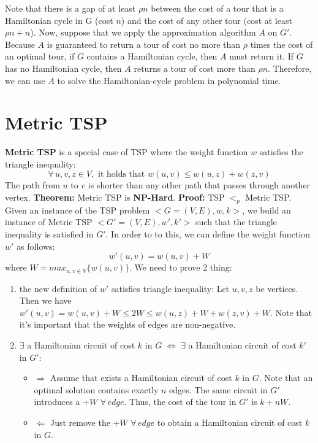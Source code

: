 Note that there is a gap of at least $\rho n$ between the cost
of a tour that is a Hamiltonian cycle in G (cost $n$) and the cost of any other tour (cost at least $\rho n + n$).\newline\newline
Now, suppose that we apply the approximation algorithm $A$ on $G'$. Because $A$ is guaranteed to return a tour of cost no more than $\rho$ times the cost of an optimal tour, if $G$ contains a Hamiltonian cycle, then $A$ must return it. If $G$ has no Hamiltonian cycle, then $A$ returns a tour of cost more than $\rho n$. Therefore, we can use $A$ to solve the Hamiltonian-cycle problem in polynomial time.


\section{Metric TSP}
\textbf{Metric TSP} is a special case of TSP where the weight function $w$ satisfies the triangle inequality:
\[\forall \, u, v, z \in V, \,\, \text{it holds that } w(u, v) \leq w(u, z) + w(z,v)\]
The path from $u$ to $v$ is shorter than any other path that passes through another vertex.\newline\newline
\textbf{Theorem:} Metric TSP is \textbf{NP-Hard}.\newline\newline
\textbf{Proof:} TSP $<_p$ Metric TSP.\newline
Given an instance of the TSP problem $<G=(V,E), w, k>$, we build an instance of Metric TSP $<G'=(V,E), w', k'>$ such that the triangle inequality is satisfied in $G'$. In order to to this, we can define the weight function $w'$ as follows:
\[w'(u, v) = w(u, v) + W\]
where $W = max_{u, v \in V}\{w(u, v)\}$.\newline\newline
We need to prove 2 thing:
\begin{enumerate}
    \item the new definition of $w'$ satisfies triangle inequality:\newline\newline
    Let $u, v, z$ be vertices. Then we have $w'(u, v) = w(u, v) + W \leq 2W \leq w(u,z) + W + w(z, v) + W$. Note that it’s important that the weights of edges are non-negative.


    \item $\exists$ a Hamiltonian circuit of cost $k$ in $G$ $\iff$ $\exists$ a Hamiltonian circuit of cost $k'$ in $G'$:
    \begin{itemize}
        \item $\Rightarrow$ Assume that exists a Hamiltonian circuit of cost $k$ in $G$. Note that an optimal solution contains exactly $n$ edges. The same circuit in $G'$ introduces a $+W$ $\forall \, edge$. Thus, the cost of the tour in $G'$ is $k + nW$.

        \item  $\Leftarrow$ Just remove the $+W$ $\forall \, edge$ to obtain a Hamiltonian circuit of cost $k$ in $G$.
    \end{itemize}
\end{enumerate}

